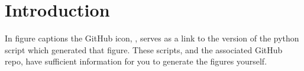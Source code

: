 \section{Introduction}
\label{sec:intro}


In figure captions the GitHub icon, , serves as a link to the version of the python script which generated that figure. These scripts, and the associated GitHub repo, have sufficient information for you to generate the figures yourself.